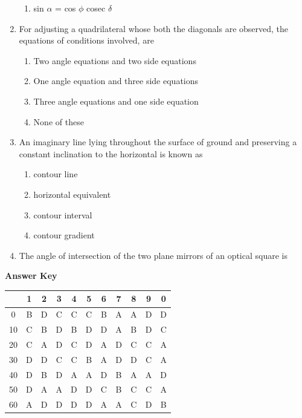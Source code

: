 \documentclass[11pt,a4paper]{article}
\begin{document}
\begin{enumerate}
\begin{enumerate}[label=\Alph*.]
\item{sin $\alpha$ = cos $\phi$ cosec $\delta$}
\end{enumerate}
\item{For adjusting a quadrilateral whose both the diagonals are observed, the equations of conditions involved, are}
\begin{enumerate}[label=\Alph*.]
\item{Two angle equations and two side equations}
\item{One angle equation and three side equations}
\item{Three angle equations and one side equation}
\item{None of these}
\end{enumerate}
\item{An imaginary line lying throughout the surface of ground and preserving a constant inclination to the horizontal is known as}
\begin{enumerate}[label=\Alph*.]
\item{contour line}
\item{horizontal equivalent}
\item{contour interval}
\item{contour gradient}
\end{enumerate}
\item{The angle of intersection of the two plane mirrors of an optical square is}
\\
\end{enumerate}
\textbf{Answer Key}
\begin{tabular}{ | c | c c c c c c c c c c | }
\hline
 & 1 & 2 & 3 & 4 & 5 & 6 & 7 & 8 & 9 & 0 \\
\hline
0 & B & D & C & C & C & B & A & A & D & D \\
10 & C & B & D & B & D & D & A & B & D & C \\
20 & C & A & D & C & D & A & D & C & C & A \\
30 & D & D & C & C & B & A & D & D & C & A \\
40 & D & B & D & A & A & D & B & A & A & D \\
50 & D & A & A & D & D & C & B & C & C & A \\
60 & A & D & D & D & D & A & A & C & D & B \\
\hline
\end{tabular}
\clearpage
\end{document}
